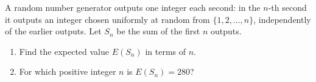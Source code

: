 A random number generator outputs one integer each second: in the $n$-th second it outputs an integer chosen uniformly at random from $\{1,2,\dots,n\}$, independently of the earlier outputs. Let $S_n$ be the sum of the first $n$ outputs.
\begin{enumerate}
\item[(a)] Find the expected value $E(S_n)$ in terms of $n$.
\item[(b)] For which positive integer $n$ is $E(S_n)=280$?
\end{enumerate}
